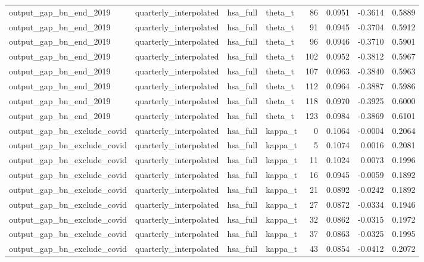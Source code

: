 \begin{tabular}{llllrrrr}
output\_gap\_bn\_end\_2019 & quarterly\_interpolated & hsa\_full & theta\_t & 86 & 0.0951 & -0.3614 & 0.5889 \\
output\_gap\_bn\_end\_2019 & quarterly\_interpolated & hsa\_full & theta\_t & 91 & 0.0945 & -0.3704 & 0.5912 \\
output\_gap\_bn\_end\_2019 & quarterly\_interpolated & hsa\_full & theta\_t & 96 & 0.0946 & -0.3710 & 0.5901 \\
output\_gap\_bn\_end\_2019 & quarterly\_interpolated & hsa\_full & theta\_t & 102 & 0.0952 & -0.3812 & 0.5967 \\
output\_gap\_bn\_end\_2019 & quarterly\_interpolated & hsa\_full & theta\_t & 107 & 0.0963 & -0.3840 & 0.5963 \\
output\_gap\_bn\_end\_2019 & quarterly\_interpolated & hsa\_full & theta\_t & 112 & 0.0964 & -0.3887 & 0.5986 \\
output\_gap\_bn\_end\_2019 & quarterly\_interpolated & hsa\_full & theta\_t & 118 & 0.0970 & -0.3925 & 0.6000 \\
output\_gap\_bn\_end\_2019 & quarterly\_interpolated & hsa\_full & theta\_t & 123 & 0.0984 & -0.3869 & 0.6101 \\
output\_gap\_bn\_exclude\_covid & quarterly\_interpolated & hsa\_full & kappa\_t & 0 & 0.1064 & -0.0004 & 0.2064 \\
output\_gap\_bn\_exclude\_covid & quarterly\_interpolated & hsa\_full & kappa\_t & 5 & 0.1074 & 0.0016 & 0.2081 \\
output\_gap\_bn\_exclude\_covid & quarterly\_interpolated & hsa\_full & kappa\_t & 11 & 0.1024 & 0.0073 & 0.1996 \\
output\_gap\_bn\_exclude\_covid & quarterly\_interpolated & hsa\_full & kappa\_t & 16 & 0.0945 & -0.0059 & 0.1892 \\
output\_gap\_bn\_exclude\_covid & quarterly\_interpolated & hsa\_full & kappa\_t & 21 & 0.0892 & -0.0242 & 0.1892 \\
output\_gap\_bn\_exclude\_covid & quarterly\_interpolated & hsa\_full & kappa\_t & 27 & 0.0872 & -0.0334 & 0.1946 \\
output\_gap\_bn\_exclude\_covid & quarterly\_interpolated & hsa\_full & kappa\_t & 32 & 0.0862 & -0.0315 & 0.1972 \\
output\_gap\_bn\_exclude\_covid & quarterly\_interpolated & hsa\_full & kappa\_t & 37 & 0.0863 & -0.0325 & 0.1995 \\
output\_gap\_bn\_exclude\_covid & quarterly\_interpolated & hsa\_full & kappa\_t & 43 & 0.0854 & -0.0412 & 0.2072 \\

\end{tabular}

